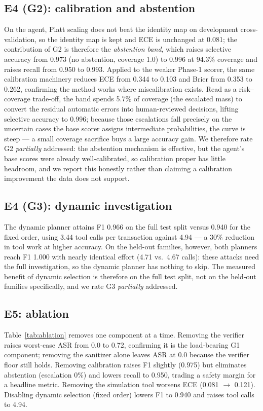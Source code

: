 \documentclass[conference]{IEEEtran}
\begin{document}
\subsection{E4 (G2): calibration and abstention}
On the agent, Platt scaling does not beat the identity map on development
cross-validation, so the identity map is kept and ECE is unchanged at 0.081; the
contribution of G2 is therefore the \emph{abstention band}, which raises selective
accuracy from 0.973 (no abstention, coverage 1.0) to 0.996 at 94.3\% coverage and
raises recall from 0.950 to 0.993. Applied to the weaker Phase-1 scorer, the same
calibration machinery reduces ECE from 0.344 to 0.103 and Brier from 0.353 to 0.262,
confirming the method works where miscalibration exists. Read as a risk--coverage
trade-off, the band spends 5.7\% of coverage (the escalated mass) to convert the
residual automatic errors into human-reviewed decisions, lifting selective accuracy to
0.996; because those escalations fall precisely on the uncertain cases the base scorer
assigns intermediate probabilities, the curve is steep --- a small coverage sacrifice
buys a large accuracy gain. We therefore rate G2 \emph{partially} addressed: the
abstention mechanism is effective, but the agent's base scores were already
well-calibrated, so calibration proper has little headroom, and we report this honestly
rather than claiming a calibration improvement the data does not support.

\subsection{E4 (G3): dynamic investigation}
The dynamic planner attains F1 0.966 on the full test split versus 0.940 for the
fixed order, using 3.44 tool calls per transaction against 4.94 --- a 30\% reduction
in tool work at higher accuracy. On the held-out families, however, both planners
reach F1 1.000 with nearly identical effort (4.71 vs.\ 4.67 calls): these attacks
need the full investigation, so the dynamic planner has nothing to skip. The measured
benefit of dynamic selection is therefore on the full test split, not on the held-out
families specifically, and we rate G3 \emph{partially} addressed.

\subsection{E5: ablation}
Table~\ref{tab:ablation} removes one component at a time. Removing the verifier
raises worst-case ASR from 0.0 to 0.72, confirming it is the load-bearing G1
component; removing the sanitizer alone leaves ASR at 0.0 because the verifier floor
still holds. Removing calibration raises F1 slightly (0.975) but eliminates
abstention (escalation 0\%) and lowers recall to 0.950, trading a safety margin for a
headline metric. Removing the simulation tool worsens ECE (0.081 $\rightarrow$ 0.121).
Disabling dynamic selection (fixed order) lowers F1 to 0.940 and raises tool calls to
4.94.
\end{document}
